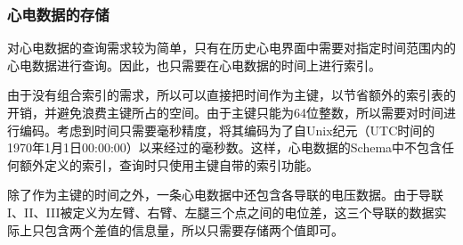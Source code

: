 \subsubsection{心电数据的存储}\label{subsubsec:point-storage}

对心电数据的查询需求较为简单，只有在历史心电界面中需要对指定时间范围内的心电数据进行查询。因此，也只需要在心电数据的时间上进行索引。

由于没有组合索引的需求，所以可以直接把时间作为主键，以节省额外的索引表的开销，并避免浪费主键所占的空间。由于主键只能为64位整数，所以需要对时间进行编码。考虑到时间只需要毫秒精度，将其编码为了自Unix纪元（UTC时间的1970年1月1日00:00:00）以来经过的毫秒数。这样，心电数据的Schema中不包含任何额外定义的索引，查询时只使用主键自带的索引功能。

除了作为主键的时间之外，一条心电数据中还包含各导联的电压数据。由于导联I、II、III被定义为左臂、右臂、左腿三个点之间的电位差，这三个导联的数据实际上只包含两个差值的信息量，所以只需要存储两个值即可。
